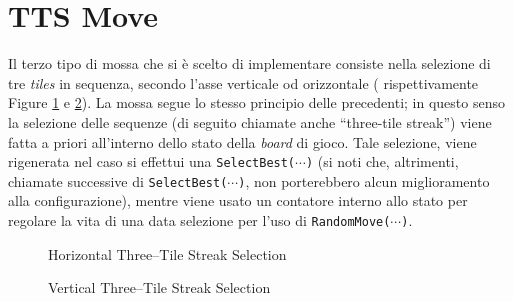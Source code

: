 
\section{TTS Move} %
\label{sec:tts_move}

    Il terzo tipo di mossa che si è scelto di implementare consiste nella selezione di tre \emph{tiles} in sequenza, secondo l'asse verticale od orizzontale ( rispettivamente Figure \ref{fig:tts1} e \ref{fig:tts2}). La mossa segue lo stesso principio delle precedenti; in questo senso la selezione delle sequenze (di seguito chiamate anche ``three-tile streak'') viene fatta a priori all'interno dello stato della \emph{board} di gioco. Tale selezione, viene rigenerata nel caso si effettui una \texttt{SelectBest($\cdots$)} (si noti che, altrimenti, chiamate successive di \texttt{SelectBest($\cdots$)}, non porterebbero alcun miglioramento alla configurazione), mentre viene usato un contatore interno allo stato per regolare la vita di una data selezione per l'uso di \texttt{RandomMove($\cdots$)}.

    \begin{figure}[H]
        \centering
        \caption{Horizontal Three--Tile Streak Selection}
        \label{fig:tts1}
    \end{figure}

    \begin{figure}[H]
        \centering
        \caption{Vertical Three--Tile Streak Selection}
        \label{fig:tts2}
    \end{figure}

